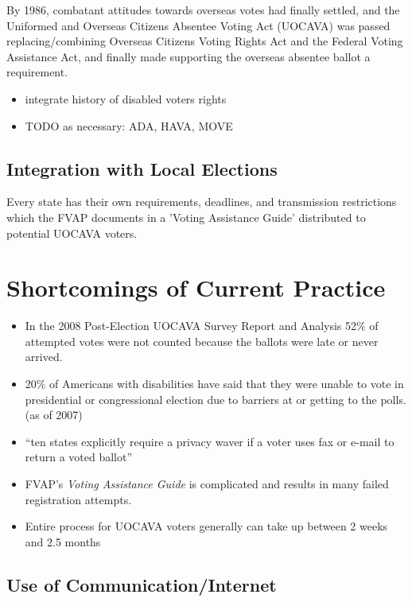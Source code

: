 By 1986, combatant attitudes towards overseas votes had finally settled, and the Uniformed and Overseas Citizens Absentee Voting Act (UOCAVA) was passed replacing/combining Overseas Citizens Voting Rights Act and the Federal Voting Assistance Act, and finally made supporting the overseas absentee ballot a requirement.

\begin{itemize}
\item integrate history of disabled voters rights
\item[\star] TODO as necessary: ADA, HAVA, MOVE
\end{itemize}

\subsection{Integration with Local Elections}

Every state has their own requirements, deadlines, and transmission restrictions which the FVAP documents in a 'Voting Assistance Guide' distributed to potential UOCAVA voters. 

\section{Shortcomings of Current Practice}

\begin{itemize}
\item In the 2008 Post-Election UOCAVA Survey Report and Analysis 52\% of attempted votes were not counted because the ballots were late or never arrived.
\item 20\% of Americans with disabilities have said that they were unable to vote in presidential or congressional election due to barriers at or getting to the polls. (as of 2007)
\item ``ten states explicitly require a privacy waver if a voter uses fax or e-mail to return a voted ballot''
\item FVAP's {\em Voting Assistance Guide} is complicated and results in many failed registration attempts.
\item Entire process for UOCAVA voters generally can take up between 2 weeks and 2.5 months
\end{itemize}

\subsection{Use of Communication/Internet}

